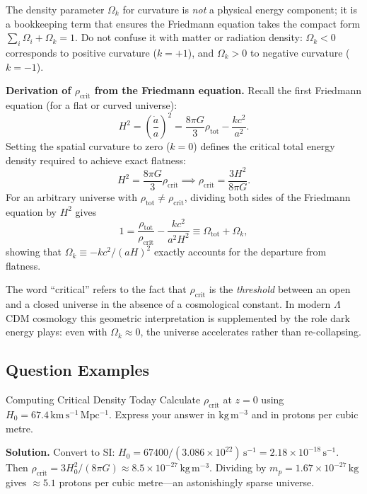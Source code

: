 \begin{importantnote}
  The density parameter $\Omega_k$ for curvature is \emph{not} a physical energy
  component; it is a bookkeeping term that ensures the Friedmann equation takes the
  compact form $\sum_i\Omega_i + \Omega_k = 1$.
  Do not confuse it with matter or radiation density: $\Omega_k < 0$ corresponds to
  positive curvature ($k = +1$), and $\Omega_k > 0$ to negative curvature ($k = -1$).
\end{importantnote}

\begin{foundation}
\textbf{Derivation of $\rho_\mathrm{crit}$ from the Friedmann equation.}
Recall the first Friedmann equation (for a flat or curved universe):
\[
  H^2 = \left(\frac{\dot a}{a}\right)^2
      = \frac{8\pi G}{3}\rho_\mathrm{tot} - \frac{kc^2}{a^2}.
\]
Setting the spatial curvature to zero ($k = 0$) defines the critical total energy
density required to achieve exact flatness:
\[
  H^2 = \frac{8\pi G}{3}\rho_\mathrm{crit}
  \implies
  \rho_\mathrm{crit} = \frac{3H^2}{8\pi G}.
\]
For an arbitrary universe with $\rho_\mathrm{tot} \neq \rho_\mathrm{crit}$,
dividing both sides of the Friedmann equation by $H^2$ gives
\[
  1 = \frac{\rho_\mathrm{tot}}{\rho_\mathrm{crit}} - \frac{kc^2}{a^2 H^2}
  \equiv \Omega_\mathrm{tot} + \Omega_k,
\]
showing that $\Omega_k \equiv -kc^2/(aH)^2$ exactly accounts for the departure
from flatness.
\end{foundation}

\begin{remark}
  The word ``critical'' refers to the fact that $\rho_\mathrm{crit}$ is the
  \emph{threshold} between an open and a closed universe in the absence of a
  cosmological constant.  In modern $\Lambda$CDM cosmology this geometric
  interpretation is supplemented by the role dark energy plays: even with
  $\Omega_k \approx 0$, the universe accelerates rather than re-collapsing.
\end{remark}

\subsection{Question Examples}

\begin{example}{Computing Critical Density Today}{}
Calculate $\rho_\mathrm{crit}$ at $z=0$ using
$H_0 = 67.4\,\mathrm{km\,s^{-1}\,Mpc^{-1}}$.
Express your answer in $\mathrm{kg\,m^{-3}}$ and in protons per cubic metre.

\medskip\textbf{Solution.}\quad
Convert to SI: $H_0 = 67400/(3.086\times10^{22})\,\mathrm{s^{-1}}
= 2.18\times10^{-18}\,\mathrm{s^{-1}}$.
Then $\rho_\mathrm{crit} = 3H_0^2/(8\pi G)
\approx 8.5\times10^{-27}\,\mathrm{kg\,m^{-3}}$.
Dividing by $m_p = 1.67\times10^{-27}\,\mathrm{kg}$ gives
$\approx 5.1$ protons per cubic metre—an astonishingly sparse universe.
\end{example}

